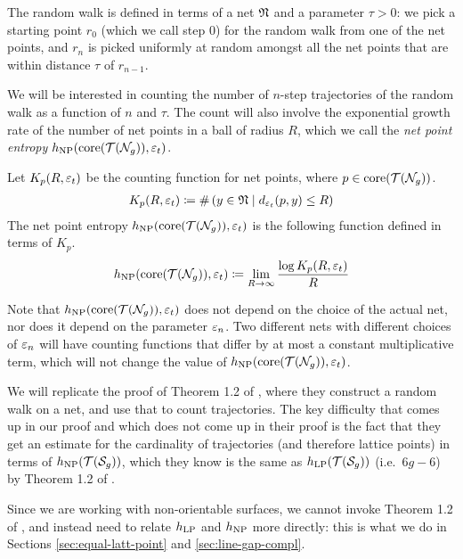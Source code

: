 The random walk is defined in terms of a net $\mathfrak{N}$ and a parameter $\tau > 0$: we pick a starting point $r_0$ (which we call step $0$) for the random walk from one of the net points, and $r_n$ is picked uniformly at random amongst all the net points that are within distance $\tau$ of $r_{n-1}$.

We will be interested in counting the number of $n$-step trajectories of the random walk as a function of $n$ and $\tau$.
The count will also involve the exponential growth rate of the number of net points in a ball of radius $R$, which we call the \emph{net point entropy} $h_{\mathrm{NP}}(\mathrm{core}(\mathcal{T}(\mathcal{N}_g)), \varepsilon_t)$.

\begin{definition}
  Let $K_p(R, \varepsilon_t)$ be the counting function for net points, where $p \in \mathrm{core}(\mathcal{T}(\mathcal{N}_g))$.
  \begin{align*}
    K_p(R, \varepsilon_t) \coloneqq \#\left( y \in \mathfrak{N} \mid d_{\varepsilon_t}(p, y) \leq R \right)
  \end{align*}
  The net point entropy $h_{\mathrm{NP}}(\mathrm{core}(\mathcal{T}(\mathcal{N}_g)), \varepsilon_t)$ is the following function defined in terms of $K_p$.
  \begin{align*}
    h_{\mathrm{NP}}(\mathrm{core}(\mathcal{T}(\mathcal{N}_g)), \varepsilon_t) \coloneqq \lim_{R \to \infty} \frac{\log K_p(R, \varepsilon_t)}{R}
  \end{align*}
\end{definition}

Note that $h_{\mathrm{NP}}(\mathrm{core}(\mathcal{T}(\mathcal{N}_g)), \varepsilon_t)$ does not depend on the choice of the actual net, nor does it depend on the parameter $\varepsilon_n$. Two different nets with different choices of $\varepsilon_n$ will have counting functions that differ by at most a constant multiplicative term, which will not change the value of $h_{\mathrm{NP}}(\mathrm{core}(\mathcal{T}(\mathcal{N}_g)), \varepsilon_t)$.

We will replicate the proof of Theorem 1.2 of \textcite{eskinmirzakhani}, where they construct a random walk on a net, and use that to count \concave trajectories.
The key difficulty that comes up in our proof and which does not come up in their proof is the fact that they get an estimate for the cardinality of \concave trajectories (and therefore \concave lattice points) in terms of $h_{\mathrm{NP}}(\mathcal{T}(\mathcal{S}_g))$, which they know is the same as $h_{\mathrm{LP}}(\mathcal{T}(\mathcal{S}_g))$ (i.e.\ $6g-6$) by Theorem 1.2 of \textcite{10.1215/00127094-1548443}.

Since we are working with non-orientable surfaces, we cannot invoke Theorem 1.2 of \textcite{10.1215/00127094-1548443}, and instead need to relate $h_{\mathrm{LP}}$ and $h_{\mathrm{NP}}$ more directly: this is what we do in Sections \ref{sec:equal-latt-point} and \ref{sec:line-gap-compl}.

